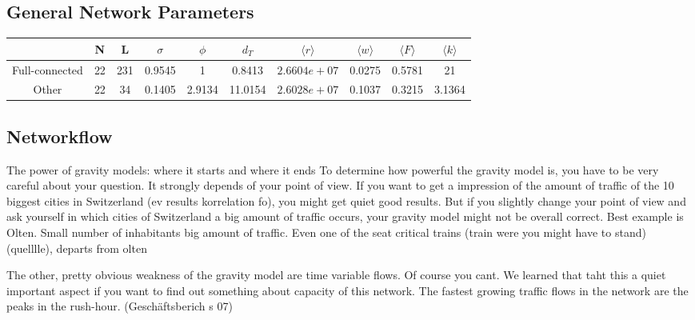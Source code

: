 \documentclass[11pt]{article}
\begin{document}
\subsection{General Network Parameters}
\begin{tabular}{c|c|c|c|c|c|c|c|c|c|}
 & N & L & $\sigma$ & $\phi$ & $d_T$ & $\langle r\rangle$ & 
 $\langle w\rangle$ & $\langle F\rangle$&$\langle k\rangle$ \\\hline
 Full-connected & 22 & 231 &0.9545&1& 0.8413& $2.6604e+07$&0.0275&0.5781& 21\\\hline
 
 Other & 22 & 34 &    0.1405&2.9134& 11.0154&$2.6028e+07$&0.1037&0.3215& 3.1364\\\hline
\end{tabular}


\subsection{Networkflow}

The power of gravity models: where it starts and where it ends
To determine how powerful the gravity model is, you have to be very careful about your question. It strongly depends of your point of view. If you want to get a impression of the amount of traffic of the 10 biggest cities in Switzerland (ev results korrelation fo), you might get quiet good results. But if you slightly change your point of view and ask yourself in which cities of Switzerland a big amount of traffic occurs, your gravity model might not be overall correct. Best example is Olten. Small number of inhabitants big amount of traffic. Even one of the seat critical trains (train were you might have to stand) (quelllle), departs from olten

The other, pretty obvious weakness of the gravity model are time variable flows. Of course you cant. We learned that taht this a quiet important aspect  if you want to find out something about capacity of this network. The fastest growing traffic flows in the network are the peaks in the rush-hour. (Geschäftsberich s 07)
\end{document}
